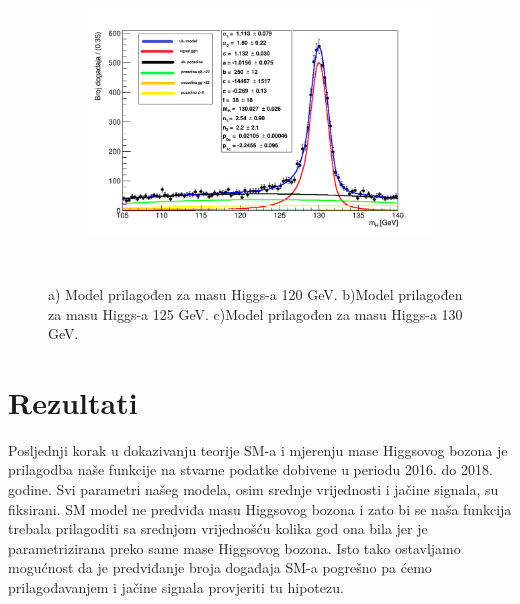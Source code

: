 \documentclass[12pt,a4paper,oneside]{article}
\begin{document}
\begin{linenumbers}
\begin{figure}[H]
\begin{subfigure}[b]{0.7\textwidth}
				\includegraphics[width=\textwidth]{simulation-130.png}
				\caption{}
				\label{fig:model-130}
			\end{subfigure}
			~ %
			\caption{a) Model prilagođen za masu Higgs-a 120 GeV.	b)Model prilagođen za masu Higgs-a 125 GeV.	c)Model prilagođen za masu Higgs-a 130 GeV.}\label{fig:grafovi-3}
		\end{figure}		
		
		
		\newpage
		\section{Rezultati}
		Posljednji korak u dokazivanju teorije SM-a i mjerenju mase Higgsovog bozona je prilagodba naše funkcije na stvarne podatke dobivene u periodu 2016. do 2018. godine. Svi parametri našeg modela, osim srednje vrijednosti i jačine signala, su fiksirani. SM model ne predviđa masu Higgsovog bozona i zato bi se naša funkcija trebala prilagoditi sa srednjom vrijednošću kolika god ona bila jer je parametrizirana preko same mase Higgsovog bozona. Isto tako ostavljamo mogućnost da je predviđanje broja događaja SM-a pogrešno pa ćemo prilagođavanjem i jačine signala provjeriti tu hipotezu.
		

\end{linenumbers}
\end{document}
